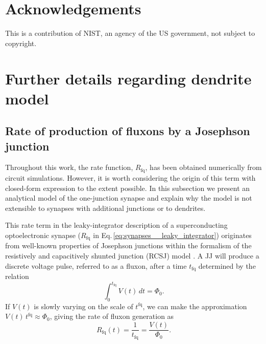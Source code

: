 \documentclass[twocolumn]{article}
\begin{document}



\vspace{1em}
\section{\label{sec:acknowledgements}Acknowledgements}
\noindent This is a contribution of NIST, an agency of the US government, not subject to copyright.

\appendix

\section{\label{apx:dendrites_model}Further details regarding dendrite model}

\subsection{Rate of production of fluxons by a Josephson junction}
Throughout this work, the rate function, $R_{\mathrm{fq}}$, has been obtained numerically from circuit simulations. However, it is worth considering the origin of this term with closed-form expression to the extent possible. In this subsection we present an analytical model of the one-junction synapse and explain why the model is not extensible to synapses with additional junctions or to dendrites.

This rate term in the leaky-integrator description of a superconducting optoelectronic synapse ($R_{\mathrm{fq}}$ in Eq.\,\ref{eq:synapses__leaky_integrator}) originates from well-known properties of Josephson junctions within the formalism of the resistively and capacitively shunted junction (RCSJ) model \cite{vatu1998,ka1999,ti1996}. A JJ will produce a discrete voltage pulse, referred to as a fluxon, after a time $t_{\mathrm{fq}}$ determined by the relation
\begin{equation}
\label{eq:jj__fluxon_production}
\int_0^{t_{\mathrm{fq}}} V(t) \, dt = \Phi_0.
\end{equation}
If $V(t)$ is slowly varying on the scale of $t^{\mathrm{fq}}$, we can make the approximation $V(t)\,t^{\mathrm{fq}} \approx \Phi_0$, giving the rate of fluxon generation as
\begin{equation}
\label{eq:jj__fluxon_rate}
R_{\mathrm{fq}}(t) =  \frac{1}{t_{\mathrm{fq}}} = \frac{V(t)}{\Phi_0}.
\end{equation}
\end{document}
